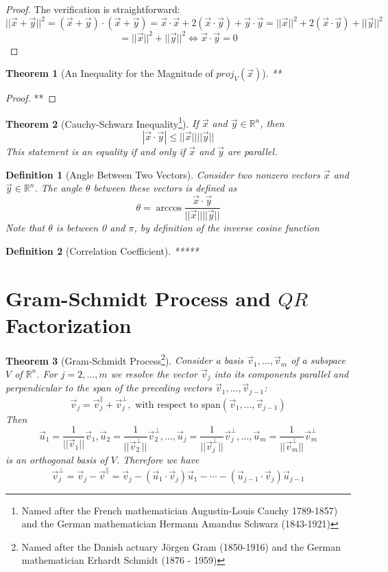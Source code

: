 \documentclass[10pt]{report}
\newtheorem{thm2}{Theorem}[section]
\newtheorem{def2}{Definition}[section]
\begin{document}
\begin{proof}
The verification is straightforward:
$$||\vec{x}+\vec{y}||^2 = (\vec{x}+\vec{y})\cdot (\vec{x}+\vec{y}) = \vec{x}\cdot \vec{x}+ 2(\vec{x}\cdot \vec{y}) + \vec{y}\cdot \vec{y} = ||\vec{x}||^2 + 2(\vec{x}\cdot \vec{y}) + ||\vec{y}||^2$$
$$=||\vec{x}||^2 + ||\vec{y}||^2 \iff \vec{x}\cdot \vec{y}=0$$
\end{proof}
\begin{thm2}[An Inequality for the Magnitude of $proj_V(\vec{x})$]**
\end{thm2}
\begin{proof}
**
\end{proof}
\begin{thm2}[Cauchy-Schwarz Inequality\footnote{Named after the French mathematician Augustin-Louis Cauchy 1789-1857) and the German mathematician Hermann Amandus Schwarz (1843-1921)}]
If $\vec{x}$ and $\vec{y}\in \mathbb{R}^n$, then
$$|\vec{x}\cdot \vec{y}|\leq ||\vec{x}||||\vec{y}||$$
This statement is an equality if and only if $\vec{x}$ and $\vec{y}$ are parallel.
\end{thm2}
\begin{def2}[Angle Between Two Vectors]
Consider two nonzero vectors $\vec{x}$ and $\vec{y}\in \mathbb{R}^n$. The angle $\theta$ between these vectors is defined as
$$\theta = \arccos\frac{\vec{x}\cdot \vec{y}}{||\vec{x}||||\vec{y}||}$$
Note that $\theta$ is between 0 and $\pi$, by definition of the inverse cosine function
\end{def2}
\begin{def2}[Correlation Coefficient]
*****
\end{def2}

\section{Gram-Schmidt Process and $QR$ Factorization}
\begin{thm2}[Gram-Schmidt Process\footnote{Named after the Danish actuary J\"{o}rgen Gram (1850-1916) and the German mathematician Erhardt Schmidt (1876 - 1959)}]
Consider a basis $\vec{v}_1, ..., \vec{v}_m$ of a subspace $V$ of $\mathbb{R}^n$. For $j=2, ..., m$ we resolve the vector $\vec{v}_j$ into its components parallel and perpendicular to the span of the preceding vectors $\vec{v}_1, ..., \vec{v}_{j-1}$:
$$\vec{v}_j = \vec{v}_j^\parallel + \vec{v}_j^\perp, \text{ with respect to span}(\vec{v}_1, ..., \vec{v}_{j-1})$$
Then
$$\vec{u}_1=\frac{1}{||\vec{v}_1||}\vec{v}_1, \vec{u}_2 = \frac{1}{||\vec{v}_2^\perp||}\vec{v}_2^\perp ,..., \vec{u}_j = \frac{1}{||\vec{v}_j^\perp||}\vec{v}_j^\perp, ..., \vec{u}_m = \frac{1}{||\vec{v}_m^\perp||}\vec{v}_m^\perp$$
is an orthogonal basis of $V$. Therefore we have
$$\vec{v}_j^\perp = \vec{v}_j-\vec{v}^\parallel = \vec{v}_j - (\vec{u}_1 \cdot \vec{v}_j)\vec{u}_1 - \cdots - (\vec{u}_{j-1} \cdot \vec{v}_j)\vec{u}_{j-1}$$
\end{thm2}
\end{document}
